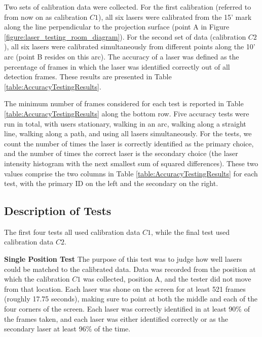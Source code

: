 Two sets of calibration data were collected. For the first calibration
(referred to from now on as calibration $C1$), all six lasers were
calibrated from the 15' mark along the line perpendicular to the
projection surface (point A in Figure
\ref{figure:laser_testing_room_diagram}). For the second set of data
(calibration $C2$), all six lasers were calibrated simultaneously from
different points along the 10' arc (point B resides on this arc). The
accuracy of a laser was defined as the percentage of frames in which
the laser was identified correctly out of all detection frames. These
results are presented in Table \ref{table:AccuracyTestingResults}.

The minimum number of frames considered for each test is reported in
Table \ref{table:AccuracyTestingResults} along the bottom row. Five
accuracy tests were run in total, with users stationary, walking in an
arc, walking along a straight line, walking along a path, and using
all lasers simultaneously. For the tests, we count the number of times
the laser is correctly identified as the primary choice, and the number of times the correct
laser is the secondary choice (the laser intensity histogram with the
next smallest sum of squared differences). These two values comprise
the two columns in Table \ref{table:AccuracyTestingResults} for each
test, with the primary ID on the left and the secondary on the right.

\subsection{Description of Tests}

The first four tests all used calibration data $C1$, while the final
test used calibration data $C2$.

\textbf{Single Position Test} The purpose of this test was to judge how
well lasers could be matched to the calibrated data. Data was recorded
from the position at which the calibration $C1$ was collected,
position A, and the tester did not move from that location. Each laser
was shone on the screen for at least 521 frames (roughly 17.75
seconds), making sure to point at both the middle and each of the four
corners of the screen. Each laser was correctly identified in at least
90\% of the frames taken, and each laser was either identified
correctly or as the secondary laser at least 96\% of the time.

